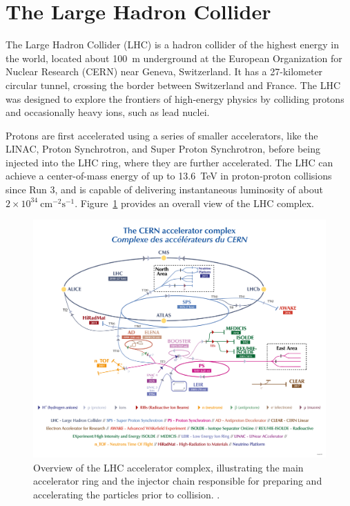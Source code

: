 \section{The Large Hadron Collider} \label{sec:LHC}
The Large Hadron Collider (LHC) is a hadron collider of the highest energy in the world, located about 100~m underground at the European Organization for Nuclear Research (CERN) near Geneva, Switzerland. It has a 27-kilometer circular tunnel, crossing the border between Switzerland and France. The LHC was designed to explore the frontiers of high-energy physics by colliding protons and occasionally heavy ions, such as lead nuclei.

Protons are first accelerated using a series of smaller accelerators, like the LINAC, Proton Synchrotron, and Super Proton Synchrotron, before being injected into the LHC ring, where they are further accelerated. The LHC can achieve a center-of-mass energy of up to 13.6~TeV in proton-proton collisions since Run 3, and is capable of delivering instantaneous luminosity of about $2 \times 10^{34}~\mathrm{cm}^{-2}\mathrm{s}^{-1}$. Figure~\ref{fig:LHC_complex} provides an overall view of the LHC complex.

\begin{figure}[htbp]
  \centering
  \includegraphics[width=1.0\textwidth]{figs/chapter1/LHC_complex.png}
  \caption{Overview of the LHC accelerator complex, illustrating the main accelerator ring and the injector chain responsible for preparing and accelerating the particles prior to collision. \cite{LHCComplex}.}
  \label{fig:LHC_complex}
\end{figure}

